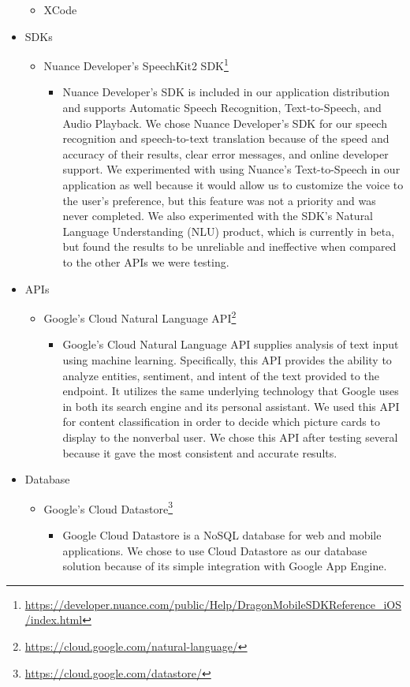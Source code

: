 \begin{itemize}
\begin{itemize}
   	 	\item XCode
	\end{itemize}
 \item SDKs
     \begin{itemize}
		\item Nuance Developer's SpeechKit2 SDK\footnote[1]{\url{https://developer.nuance.com/public/Help/DragonMobileSDKReference_iOS/index.html}}
		\begin{itemize}
		\item Nuance Developer's SDK is included in our application distribution and supports Automatic Speech Recognition, Text-to-Speech, and Audio Playback. We chose Nuance Developer's SDK for our speech recognition and speech-to-text translation because of the speed and accuracy of their results, clear error messages, and online developer support. We experimented with using Nuance's Text-to-Speech in our application as well because it would allow us to customize the voice to the user's preference, but this feature was not a priority and was never completed. We also experimented with the SDK's Natural Language Understanding (NLU) product, which is currently in beta, but found the results to be unreliable and ineffective when compared to the other APIs we were testing.
		\end{itemize}
	\end{itemize}
    \item APIs
     \begin{itemize}
		\item Google's Cloud Natural Language API\footnote[2]{\url{https://cloud.google.com/natural-language/}}
		\begin{itemize}
		\item Google's Cloud Natural Language API supplies analysis of text input using machine learning. Specifically, this API provides the ability to analyze entities, sentiment, and intent of the text provided to the endpoint. It utilizes the same underlying technology that Google uses in both its search engine and its personal assistant. We used this API for content classification in order to decide which picture cards to display to the nonverbal user. We chose this API after testing several because it gave the most consistent and accurate results.
		\end{itemize}
	\end{itemize}
    \item Database
     \begin{itemize}
   	 	\item Google's Cloud Datastore\footnote[3]{\url{https://cloud.google.com/datastore/}}
		\begin{itemize}
			\item Google Cloud Datastore is a NoSQL database for web and mobile applications. We chose to use Cloud Datastore as our database solution because of its simple integration with Google App Engine.
		\end{itemize}
	\end{itemize}
\end{itemize}